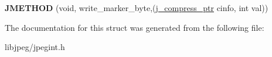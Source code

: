 \begin{DoxyCompactItemize}
\item 
\hypertarget{structjpeg__marker__writer_a193395c80dab66a95681aff53cd5c468}{{\bfseries J\-M\-E\-T\-H\-O\-D} (void, write\-\_\-marker\-\_\-byte,(\hyperlink{structjpeg__compress__struct}{j\-\_\-compress\-\_\-ptr} cinfo, int val))}\label{structjpeg__marker__writer_a193395c80dab66a95681aff53cd5c468}

\end{DoxyCompactItemize}


The documentation for this struct was generated from the following file\-:\begin{DoxyCompactItemize}
\item 
libjpeg/jpegint.\-h\end{DoxyCompactItemize}
